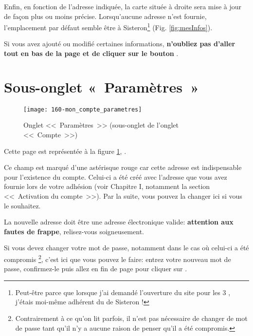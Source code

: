 Enfin, en fonction de l'adresse indiquée, la carte située à droite sera mise à jour de façon plus ou moins précise. Lorsqu'aucune adresse n'est fournie, l'emplacement par défaut semble être à Sisteron\footnote{Peut-être parce que lorsque j'ai demandé l'ouverture du site \CF{} pour les 3 \sel{}, j'étais moi-même adhérent du \sel{} de Sisteron !} (Fig. \ref{fig:mesInfos}).

Si vous avez ajouté ou modifié certaines informations, \textbf{n'oubliez pas d'aller tout en bas de la page et de cliquer sur le bouton} .

\section{Sous-onglet «~Paramètres~»}
\begin{figure}
    \texttt{[image: 160-mon\_compte\_parametres]}
    \caption[Onglet <<~Paramètres~>>]{Onglet <<~Paramètres~>> (sous-onglet de l'onglet <<~Compte~>>)}
    \label{fig:pageParametres}
\end{figure}

Cette page est représentée à la figure \ref{fig:pageParametres}, .


Ce champ est marqué d'une astérisque rouge car cette adresse est indispensable pour l'existence du compte. Celui-ci a été créé avec l'adresse que vous avez fournie lors de votre adhésion (voir Chapitre I, notamment la section <<~Activation du compte~>>). Par la suite, vous pouvez la changer ici si vous le souhaitez.

La nouvelle adresse doit être une adresse électronique valide: \textbf{attention aux fautes de frappe}, relisez-vous soigneusement.

\label{sec:changerMotDePasse}

Si vous devez changer votre mot de passe, notamment dans le cas où celui-ci a été compromis%
\footnote{Contrairement à ce qu'on lit parfois, il n'est pas nécessaire de changer de mot de passe tant qu'il n'y a aucune raison de penser qu'il a été compromis.},
 c’est ici que vous pouvez le faire: entrez votre nouveau mot de passe, confirmez-le puis allez en fin de page pour cliquer sur .


